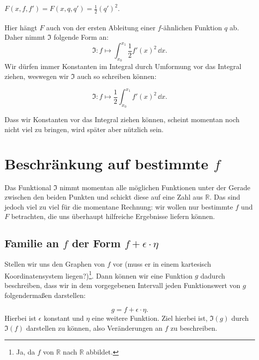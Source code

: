 \paragraph{$F(x,f,f')=F(x,q,q')=\frac{1}{2}{(q')}^2.$} Hier hängt $F$ auch von der ersten Ableitung einer $f$-ähnlichen Funktion $q$ ab. Daher nimmt $\mathfrak{I}$ folgende Form an:
\begin{equation}
\mathfrak{I} \colon f \mapsto \int_{x_0}^{x_1} \frac{1}{2} {f'(x)}^2 \,\dd x.
\end{equation}
Wir dürfen immer Konstanten im Integral durch Umformung vor das Integral ziehen, weswegen wir $\mathfrak{I}$ auch so schreiben können:

\begin{equation}
 \mathfrak{I} \colon f \mapsto \frac{1}{2} \int_{x_0}^{x_1} {f'(x)}^2 \,\dd x.
\end{equation}

Dass wir Konstanten vor das Integral ziehen können, scheint momentan noch nicht viel zu bringen, wird später aber nützlich sein.

\section{Beschränkung auf bestimmte $f$}
Das Funktional $\mathfrak{I}$ nimmt momentan alle möglichen Funktionen unter der Gerade zwischen den beiden Punkten und schickt diese auf eine Zahl aus $\mathbb{R}$.
Das sind jedoch viel zu viel für die momentane Rechnung: wir wollen nur bestimmte $f$ und $F$ betrachten, die uns überhaupt hilfreiche Ergebnisse liefern können. 

\subsection{Familie an $f$ der Form $f+\epsilon\cdot\eta$}
Stellen wir uns den Graphen von $f$ vor (muss er in einem kartesisch Koordinatensystem liegen?)\footnote{Ja, da $f$ von $\mathbb{R}$ nach $\mathbb{R}$ abbildet.}. 
Dann können wir eine Funktion $g$ dadurch beschreiben, dass wir in dem vorgegebenen Intervall jeden Funktionswert von $g$ folgendermaßen darstellen:

\begin{equation} \label{f+eh}
 g= f + \epsilon \cdot \eta.
\end{equation}
Hierbei ist $\epsilon$ konstant und $\eta$ eine weitere Funktion. 
Ziel hierbei ist, $\mathfrak{I}(g)$ durch $\mathfrak{I}(f)$ darstellen zu können, also Veränderungen an $f$ zu beschreiben.



